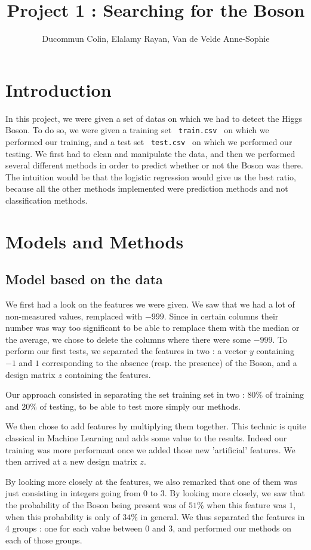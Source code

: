 \documentclass[11pt, oneside]{article}   	%
\title{Project 1 : Searching for the Boson}
\author{Ducommun Colin, Elalamy Rayan, Van de Velde Anne-Sophie}
\begin{document}
\maketitle
\section{Introduction}
In this project, we were given a set of datas on which we had to detect the Higgs Boson. To do so, we were given a training set \lstinline! train.csv ! on which we performed our training, and a test set \lstinline" test.csv " on which we performed our testing. We first had to clean and manipulate the data, and then we performed several different methods in order to predict whether or not the Boson was there. The intuition would be that the logistic regression would give us the best ratio, because all the other methods implemented were prediction methods and not classification methods.

\section{Models and Methods}

\subsection{Model based on the data}
We first had a look on the features we were given. We saw that we had a lot of non-measured values, remplaced with $-999$. Since in certain columns their number was way too significant to be able to remplace them with the median or the average, we chose to delete the columns where there were some $-999$. To perform our first tests, we separated the features in two : a vector $y$ containing $-1$ and $1$ corresponding to the absence (resp. the presence) of the Boson, and a design matrix $z$ containing the features.

Our approach consisted in separating the set training set in two : $80\%$ of training and $20\%$ of testing, to be able to test more simply our methods. 

We then chose to add features by multiplying them together. This technic is quite classical in Machine Learning and adds some value to the results. Indeed our training was more performant once we added those new 'artificial' features. We then arrived at a new design matrix $z$.

By looking more closely at the features, we also remarked that one of them was just consisting in integers going from $0$ to $3$. By looking more closely, we saw that the probability of the Boson being present was of $51\%$ when this feature was $1$, when this probability is only of $34\%$ in general. We thus separated the features in 4 groups : one for each value between $0$ and $3$, and performed our methods on each of those groups.
\end{document}
